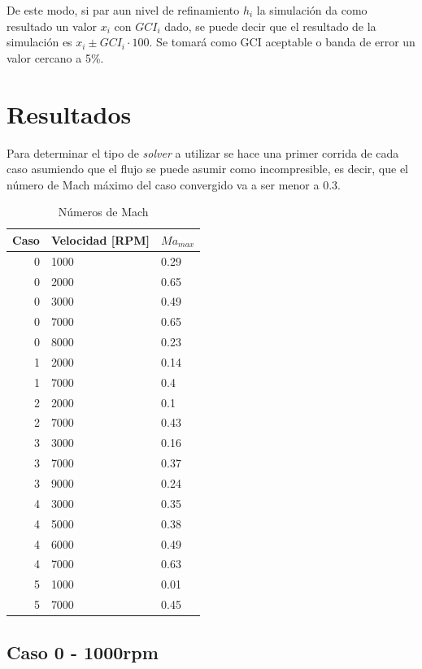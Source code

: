 \documentclass[11pt]{article}
\begin{document}
De este modo, si par aun nivel de refinamiento $h_i$ la simulación da como
resultado un valor $x_i$ con $GCI_i$ dado, se puede decir que el resultado
de la simulación es $x_i \pm GCI_i \cdot 100$.
%
Se tomará como GCI aceptable o banda de error un valor cercano a 5\%.

\section{Resultados}

Para determinar el tipo de \emph{solver} a utilizar se hace una primer corrida
de cada caso asumiendo que el flujo se puede asumir como incompresible, es
decir, que el número de Mach máximo del caso convergido va a ser menor a 0.3.
%

\begin{table}
    \centering
    \begin{tabular}{rll}\toprule
        Caso & Velocidad [RPM] & $Ma_{max}$ \\ \midrule
        0 & 1000 & 0.29 \\
        0 & 2000 & 0.65 \\
        0 & 3000 & 0.49 \\
        0 & 7000 & 0.65 \\
        0 & 8000 & 0.23 \\
        1 & 2000 & 0.14 \\
        1 & 7000 & 0.4 \\
        2 & 2000 & 0.1 \\
        2 & 7000 & 0.43 \\
        3 & 3000 & 0.16 \\
        3 & 7000 & 0.37 \\
        3 & 9000 & 0.24 \\
        4 & 3000 & 0.35 \\
        4 & 5000 & 0.38 \\
        4 & 6000 & 0.49 \\
        4 & 7000 & 0.63 \\
        5 & 1000 & 0.01 \\
        5 & 7000 & 0.45 \\ \bottomrule
    \end{tabular}
    \caption{Números de Mach}
    \label{tab:mach}
\end{table}

\subsection{Caso 0 - 1000rpm}
\end{document}
